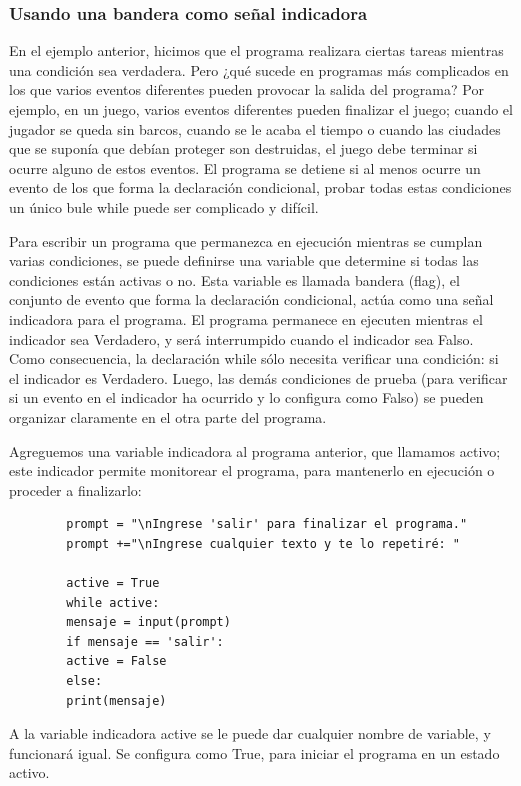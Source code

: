 	
	\subsubsection{Usando una bandera como señal indicadora}
	
	En el ejemplo anterior, hicimos que el programa realizara ciertas tareas mientras una condición sea verdadera. Pero ¿qué sucede en programas más complicados en los que varios eventos diferentes pueden provocar la salida del programa?  Por ejemplo, en un juego, varios eventos diferentes pueden finalizar el juego; cuando el jugador se queda sin barcos, cuando se le acaba el tiempo o cuando las ciudades que se suponía que debían proteger son destruidas, el juego debe terminar si ocurre alguno de estos eventos. El programa se detiene si al menos ocurre un evento de los que forma la declaración condicional,  probar todas estas condiciones un único bule  while  puede  ser complicado y difícil.  
	
	Para escribir un programa que permanezca en ejecución  mientras se cumplan varias condiciones, se puede definirse una variable que determine si todas las condiciones están activas o no. Esta variable es llamada  bandera (flag), el conjunto de evento que forma la declaración condicional,  actúa como una señal indicadora para el programa.  El programa permanece  en ejecuten mientras el indicador sea  Verdadero, y será interrumpido cuando el  indicador sea Falso. Como consecuencia, la declaración  {\ttfamily while} sólo necesita verificar una condición: si el indicador es Verdadero. Luego, las demás condiciones de prueba (para verificar si un evento en el indicador ha ocurrido y lo configura como Falso) se pueden organizar claramente en el otra parte  del programa.
	
	Agreguemos una variable indicadora al programa anterior, que llamamos  {\ttfamily activo}; este indicador   permite  monitorear el programa,  para mantenerlo en ejecución o proceder a finalizarlo:
	
	\begin{lstlisting}
		prompt = "\nIngrese 'salir' para finalizar el programa."
		prompt +="\nIngrese cualquier texto y te lo repetiré: "
		
		active = True
		while active:
		mensaje = input(prompt)
		if mensaje == 'salir':
		active = False
		else:
		print(mensaje)            
	\end{lstlisting}	
	
	
	A la variable  indicadora {\ttfamily active} se le puede dar cualquier nombre de variable, y funcionará igual. Se configura como  {\ttfamily True},  para iniciar el programa en un estado activo. 
	
